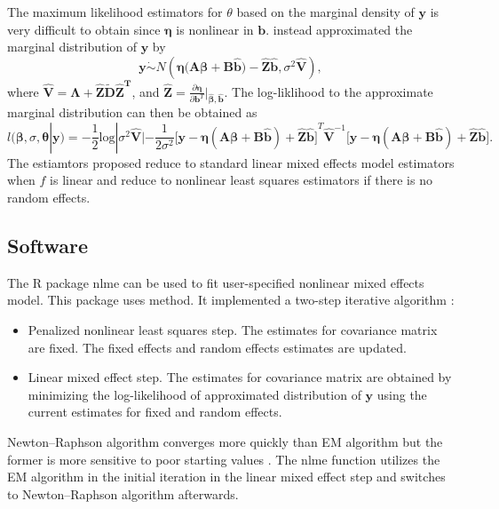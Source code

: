 \documentclass{article}
\numberwithin{equation}{section}
\begin{document}
The maximum likelihood estimators for $\theta$ based on the marginal density of $\bm{y}$ is very difficult to obtain since $\bm{\eta}$ is nonlinear in $\bm{b}$. \cite{lindstrom1990nonlinear} instead approximated the marginal distribution of $\bm{y}$ by
\begin{equation}
\bm{y} \dot\sim N(\bm{\eta(A\beta} + \bm{B\hat{b})} - \bm{ \hat{Z}\hat{b}},\sigma^2\bm{\hat{V}}),
\end{equation}
where $\hat{\bm{V}} = \bm{\Lambda} + \bm{\hat{Z}\widetilde{D}\hat{Z}^T}$, and $\hat{\bm{Z}} = \frac{\partial \bm{\eta} }{\partial \bm{b}^T}|_{\hat{\bm{\beta}},\hat{\bm{b}}}$. The log-liklihood to the approximate marginal distribution can then be obtained as
\begin{equation}
l(\bm{\beta},\sigma,\bm{\theta}|\bm{y}) = -\frac{1}{2} \text{log}|\sigma^2\hat{\bm{V}}|-\frac{1}{2\sigma^{2}}[\bm{y} - \bm{\eta(A\beta+B\hat{b})+ \hat{Z}\hat{b}]}^T \hat{\bm{V}}^{-1}[\bm{y} - \bm{\eta(A\beta+B\hat{b})+ \hat{Z}\hat{b}]}.
\end{equation}
The estiamtors \cite{lindstrom1990nonlinear} proposed reduce to standard linear mixed effects model estimators when $f$ is linear and reduce to nonlinear least squares estimators if there is no random effects.




\subsection{Software}
The R package nlme \cite{pinheiro2017package} can be used to fit user-specified nonlinear mixed effects model. This package uses \cite{lindstrom1990nonlinear} method. It implemented a two-step iterative algorithm \cite{stegmann2018nonlinear}:
\begin{itemize}
	\item Penalized nonlinear least squares step. The estimates for covariance matrix are fixed. The fixed effects and random effects estimates are updated.
	
	\item Linear mixed effect step. The estimates for covariance matrix are obtained by minimizing the log-likelihood of approximated distribution of $\bm{y}$ using the current estimates for fixed and random effects.
\end{itemize}
Newton–Raphson algorithm converges more quickly than EM algorithm but the former is more sensitive to poor starting values \cite{stegmann2018nonlinear}. The nlme function utilizes the EM algorithm in the initial iteration in the linear mixed effect step and switches to Newton–Raphson algorithm afterwards. 








 
	
\end{document}
